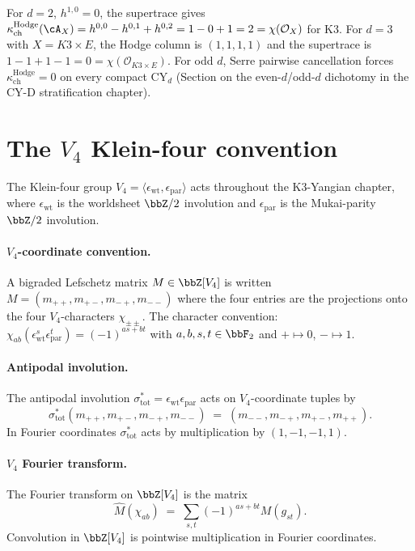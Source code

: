 For $d = 2$, $h^{1,0} = 0$, the supertrace gives
$\kappa_{\mathrm{ch}}^{\mathrm{Hodge}}(\cA_X) = h^{0,0} - h^{0,1} + h^{0,2} =
1 - 0 + 1 = 2 = \chi(\mathcal{O}_X)$ for K3. For $d = 3$ with $X = K3 \times E$,
the Hodge column is $(1,1,1,1)$ and the supertrace is
$1 - 1 + 1 - 1 = 0 = \chi(\mathcal{O}_{K3 \times E})$. For odd $d$, Serre pairwise
cancellation forces $\kappa_{\mathrm{ch}}^{\mathrm{Hodge}} = 0$ on every compact CY$_d$
\textup{(}Section on the even-$d$/odd-$d$ dichotomy in the CY-D
stratification chapter\textup{).}


\section{The \texorpdfstring{$V_4$}{V-4} Klein-four convention}
\label{sec:V4-convention}

The Klein-four group $V_4 = \langle \epsilon_{\mathrm{wt}},
\epsilon_{\mathrm{par}} \rangle$ acts throughout the K3-Yangian chapter,
where $\epsilon_{\mathrm{wt}}$ is the worldsheet $\bbZ/2$ involution and
$\epsilon_{\mathrm{par}}$ is the Mukai-parity $\bbZ/2$ involution.

\paragraph{\texorpdfstring{$V_4$}{V-4}-coordinate convention.}
A bigraded Lefschetz matrix $M \in \bbZ[V_4]$ is written
$M = (m_{++}, m_{+-}, m_{-+}, m_{--})$ where the four entries are the
projections onto the four $V_4$-characters
$\chi_{\pm \pm}$. The character convention:
$\chi_{ab}(\epsilon_{\mathrm{wt}}^s \epsilon_{\mathrm{par}}^t) = (-1)^{a s + b t}$
with $a, b, s, t \in \bbF_2$ and $+ \mapsto 0$, $- \mapsto 1$.

\paragraph{Antipodal involution.}
The antipodal involution $\sigma_{\mathrm{tot}}^* =
\epsilon_{\mathrm{wt}} \epsilon_{\mathrm{par}}$ acts on $V_4$-coordinate
tuples by
\[
 \sigma_{\mathrm{tot}}^* (m_{++}, m_{+-}, m_{-+}, m_{--}) \;=\; (m_{--}, m_{-+}, m_{+-}, m_{++}).
\]
In Fourier coordinates $\sigma_{\mathrm{tot}}^*$ acts by multiplication by
$(1, -1, -1, 1)$.

\paragraph{\texorpdfstring{$V_4$}{V-4} Fourier transform.}
The Fourier transform on $\bbZ[V_4]$ is the matrix
\[
 \hat M(\chi_{ab}) \;=\; \sum_{s, t} (-1)^{a s + b t} M(g_{st}).
\]
Convolution in $\bbZ[V_4]$ is pointwise multiplication in Fourier
coordinates.


